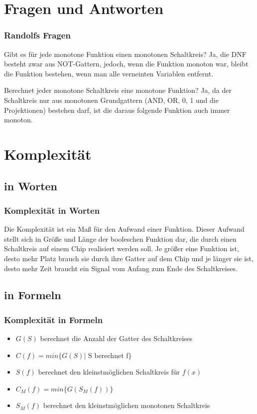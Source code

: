 \documentclass[hyperref={pdfpagelabels=false}]{beamer} %
\begin{document}
  \section{Fragen und Antworten}
  \begin{frame}%
    \frametitle{Randolfs Fragen}
    \begin{block}{Gibt es für jede monotone Funktion einen monotonen Schaltkreis?}
      Ja, die DNF besteht zwar aus NOT-Gattern, jedoch, wenn die Funktion monoton war, bleibt die Funktion bestehen, wenn man alle verneinten Variablen entfernt.
    \end{block}
    \begin{block}{Berechnet jeder monotone Schaltkreis eine monotone Funktion?}
      Ja, da der Schaltkreis nur aus monotonen Grundgattern (AND, OR, 0, 1 und die Projektionen) bestehen darf, ist die daraus folgende Funktion auch immer monoton.
    \end{block}
  \end{frame}

  \section{Komplexität}
  \subsection*{in Worten}
    \begin{frame}%
    \frametitle{Komplexität in Worten}
    Die Komplexität ist ein Maß für den Aufwand einer Funktion.
    Dieser Aufwand stellt sich in Grö\ss{}e und Länge der booleschen Funktion dar, die durch einen Schaltkreis auf einem Chip realisiert werden soll.
    Je grö\ss{}er eine Funktion ist, desto mehr Platz brauch sie durch ihre Gatter auf dem Chip und je länger sie ist, desto mehr Zeit braucht ein Signal vom Anfang zum Ende des Schaltkreises.
  \end{frame}

  \subsection*{in Formeln}
  \begin{frame}
    \frametitle{Komplexität in Formeln}
    \begin{itemize}
      \item $G(S)$ berechnet die Anzahl der Gatter des Schaltkreises
      \item $C(f) = min \{G(S) |$ S berechnet f$\}$
      \item $S(f)$ berechnet den kleinstmöglichen Schaltkreis für $f(x)$
      \item $C_M(f) = min \{G(S_M(f))\}$
      \item $S_M(f)$ berechnet den kleinstmöglichen monotonen Schaltkreis
    \end{itemize}
  \end{frame}
\end{document}
